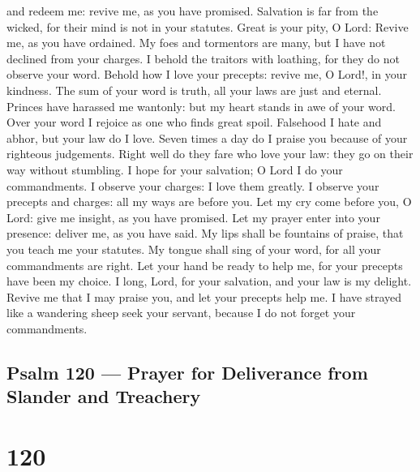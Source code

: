 and redeem me: revive me, as you have promised.  Salvation
is far from the wicked, for their mind is not in your statutes.
 Great is your pity, O Lord: Revive me, as you have
ordained.  My foes and tormentors are many, but I have not
declined from your charges.  I behold the traitors with
loathing, for they do not observe your word.  Behold how I
love your precepts: revive me, O Lord!, in your kindness. 
The sum of your word is truth, all your laws are just and eternal.
 Princes have harassed me wantonly: but my heart stands in
awe of your word.  Over your word I rejoice as one who
finds great spoil.  Falsehood I hate and abhor, but your
law do I love.  Seven times a day do I praise you because
of your righteous judgements.  Right well do they fare who
love your law: they go on their way without stumbling.  I
hope for your salvation; O Lord I do your commandments.  I
observe your charges: I love them greatly.  I observe your
precepts and charges: all my ways are before you.  Let my
cry come before you, O Lord: give me insight, as you have promised.
 Let my prayer enter into your presence: deliver me, as
you have said.  My lips shall be fountains of praise, that
you teach me your statutes.  My tongue shall sing of your
word, for all your commandments are right.  Let your hand
be ready to help me, for your precepts have been my choice.
 I long, Lord, for your salvation, and your law is my
delight.  Revive me that I may praise you, and let your
precepts help me.  I have strayed like a wandering sheep
seek your servant, because I do not forget your commandments.

\hypertarget{psalm-120-prayer-for-deliverance-from-slander-and-treachery}{%
\subsection{Psalm 120 --- Prayer for Deliverance from Slander and
Treachery}\label{psalm-120-prayer-for-deliverance-from-slander-and-treachery}}

\hypertarget{section-119}{%
\section{120}\label{section-119}}

